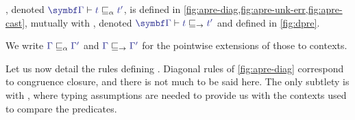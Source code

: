 \begin{figure*}[ht]
	\caption{ in , diagonal rules}
	\label{fig:apre-diag}
\end{figure*}

\begin{minipage}{\textwidth}
\begin{definition}

  , denoted $\tcol{\GG} \vdash \tcol{t}
  \capre \tcol{t'}$, is defined in \cref{fig:apre-diag,fig:apre-unk-err,fig:apre-cast},
  mutually with ,
  denoted $\tcol{\GG} \vdash \tcol{t} \cdpre \tcol{t'}$
  and defined in \cref{fig:dpre}.

  We write $\tcol{\Gamma} \capre \tcol{\Gamma'}$ and $\tcol{\Gamma} \cdpre \tcol{\Gamma'}$ for the pointwise extensions of those to contexts.

\end{definition}
\end{minipage}

Let us now detail the rules defining .
Diagonal rules of \cref{fig:apre-diag} correspond to congruence closure, and there is
not much to be said here. The only subtlety is with ,
where typing assumptions are needed to provide us with the contexts
used to compare the predicates.

\begin{figure*}[ht]
  \ContinuedFloat
  \caption{ in ,  and }
  \label{fig:apre-unk-err}
\end{figure*}


